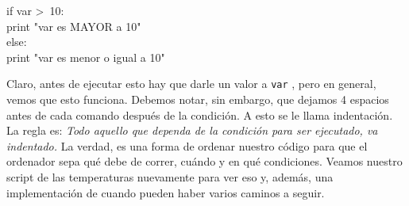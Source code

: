 \documentclass[10pt,letterpaper]{article}
\newcommand{\inlinecode}[1]{
\colorbox{light-gray}{\texttt{#1}}
}
\newenvironment{Code}
{
\begin{lrbox}{\selvestebox}%
\begin{minipage}{\dimexpr\columnwidth-2\fboxsep\relax}
\fontfamily{\ttdefault}\selectfont
}
{\end{minipage}\end{lrbox}%
\begin{center}
\colorbox{light-gray}{\usebox{\selvestebox}}
\end{center}
}
\begin{document}
\begin{Code}
if var >\ 10:\\
\hspace*{5mm} print "var es MAYOR a 10"\\
else:\\
\hspace*{5mm} print "var es menor o igual a 10"
\end{Code}

Claro, antes de ejecutar esto hay que darle un valor a \inlinecode{var}, pero en general, vemos que esto funciona. Debemos notar, sin embargo, que dejamos 4 espacios antes de cada comando despu\'es de la condici\'on. A esto se le llama indentaci\'on. La regla es: \textit{Todo aquello que dependa de la condici\'on para ser ejecutado, va indentado.} La verdad, es una forma de ordenar nuestro c\'odigo para que el ordenador sepa qu\'e debe de correr, cu\'ando y en qu\'e condiciones. Veamos nuestro script de las temperaturas nuevamente para ver eso y, adem\'as, una implementaci\'on de cuando pueden haber varios caminos a seguir.
\end{document}
